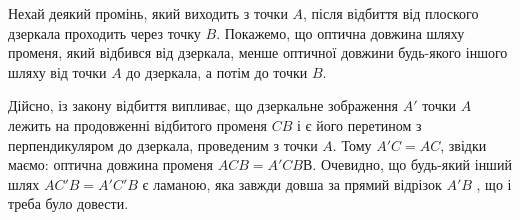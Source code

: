 \begin{solutionexample}
	Нехай деякий промінь, який виходить з точки $A$, після відбиття від
	плоского дзеркала проходить через точку $B$. Покажемо, що
	оптична довжина шляху променя, який відбився від дзеркала, менше
	оптичної довжини будь-якого іншого шляху від точки $A$ до дзеркала, а
	потім до точки $B$.

	\begin{center}
	\end{center}

	Дійсно, із закону відбиття випливає, що дзеркальне зображення $A'$
	точки $A$ лежить на продовженні відбитого променя $CB$ і є його перетином з
	перпендикуляром до дзеркала, проведеним з точки $A$. Тому $A'C=AC$, звідки
	маємо: оптична довжина променя $ACB=A'CBВ$. Очевидно, що будь-який
	інший шлях $AC'B = A'C'B$ є ламаною, яка завжди довша за прямий відрізок
	$A'B$ , що і треба було довести.
\end{solutionexample}


